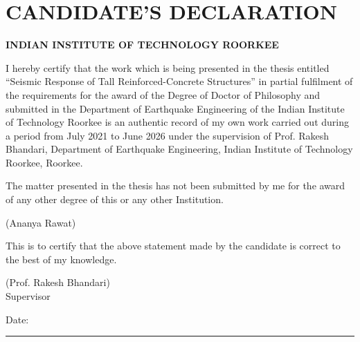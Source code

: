 \chapter*{CANDIDATE'S DECLARATION}
{\centering\bfseries INDIAN INSTITUTE OF TECHNOLOGY ROORKEE\par}
\vspace{1em}
I hereby certify that the work which is being presented in the thesis entitled
``Seismic Response of Tall Reinforced-Concrete Structures'' in partial fulfilment of the requirements for the award of the Degree
of Doctor of Philosophy and submitted in the Department of Earthquake Engineering of the Indian Institute of
Technology Roorkee is an authentic record of my own work carried out during a period from July
2021 to June 2026 under the supervision of Prof. Rakesh Bhandari, Department of Earthquake Engineering,
Indian Institute of Technology Roorkee, Roorkee.\par
\vspace{0.6em}
The matter presented in the thesis has not been submitted by me for the award of any other
degree of this or any other Institution.\par
\vspace{0.6in}
\hfill(Ananya Rawat)\par
\vspace{1em}
This is to certify that the above statement made by the candidate is correct to the best of my
knowledge.\par
\vspace{0.6in}
\hfill(Prof. Rakesh Bhandari)\\
\hfill Supervisor\par
\vspace{0.2in}
\noindent Date: \rule{1.2in}{0.4pt}
\clearpage

